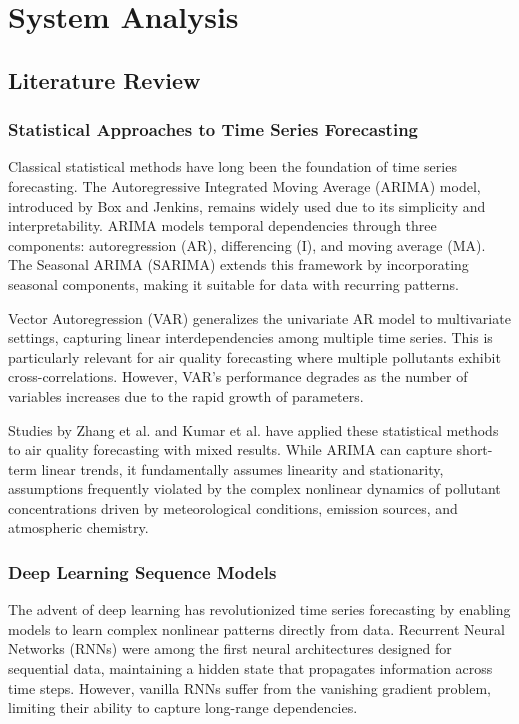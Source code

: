 \chapter{System Analysis}

\section{Literature Review}

\subsection{Statistical Approaches to Time Series Forecasting}

Classical statistical methods have long been the foundation of time series forecasting. The Autoregressive Integrated Moving Average (ARIMA) model, introduced by Box and Jenkins, remains widely used due to its simplicity and interpretability. ARIMA models temporal dependencies through three components: autoregression (AR), differencing (I), and moving average (MA). The Seasonal ARIMA (SARIMA) extends this framework by incorporating seasonal components, making it suitable for data with recurring patterns.

Vector Autoregression (VAR) generalizes the univariate AR model to multivariate settings, capturing linear interdependencies among multiple time series. This is particularly relevant for air quality forecasting where multiple pollutants exhibit cross-correlations. However, VAR's performance degrades as the number of variables increases due to the rapid growth of parameters.

Studies by Zhang et al. and Kumar et al. have applied these statistical methods to air quality forecasting with mixed results. While ARIMA can capture short-term linear trends, it fundamentally assumes linearity and stationarity, assumptions frequently violated by the complex nonlinear dynamics of pollutant concentrations driven by meteorological conditions, emission sources, and atmospheric chemistry.

\subsection{Deep Learning Sequence Models}

The advent of deep learning has revolutionized time series forecasting by enabling models to learn complex nonlinear patterns directly from data. Recurrent Neural Networks (RNNs) were among the first neural architectures designed for sequential data, maintaining a hidden state that propagates information across time steps. However, vanilla RNNs suffer from the vanishing gradient problem, limiting their ability to capture long-range dependencies.

